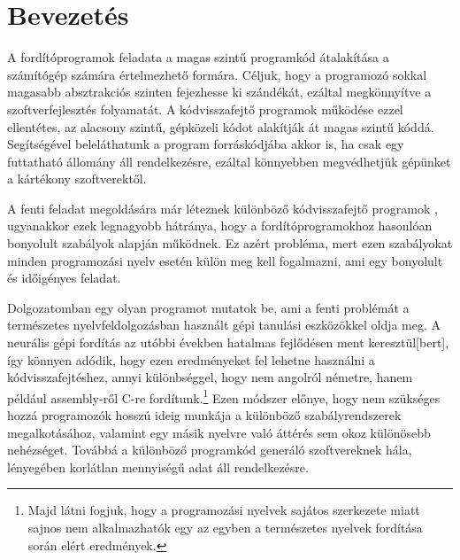 \chapter{Bevezetés}
\label{ch:intro}

A fordítóprogramok feladata a magas szintű programkód átalakítása a számítógép számára értelmezhető formára. Céljuk, hogy a programozó sokkal magasabb absztrakciós szinten fejezhesse ki szándékát, ezáltal megkönnyítve a szoftverfejlesztés folyamatát. A kódvisszafejtő programok működése ezzel ellentétes, az alacsony szintű, gépközeli kódot alakítják át magas szintű kóddá. Segítségével beleláthatunk a program forráskódjába akkor is, ha csak egy futtatható állomány áll rendelkezésre, ezáltal könnyebben megvédhetjük gépünket a kártékony szoftverektől.

A fenti feladat megoldására már léteznek különböző kódvisszafejtő programok \cite{ghidra, binaryninja}, ugyanakkor ezek legnagyobb hátránya, hogy a fordítóprogramokhoz hasonlóan bonyolult szabályok alapján működnek. Ez azért probléma, mert ezen szabályokat minden programozási nyelv esetén külön meg kell fogalmazni, ami egy bonyolult és időigényes feladat.

Dolgozatomban egy olyan programot mutatok be, ami a fenti problémát a természetes nyelvfeldolgozásban használt gépi tanulási eszközökkel oldja meg. A neurális gépi fordítás az utóbbi években hatalmas fejlődésen ment keresztül[bert], így könnyen adódik, hogy ezen eredményeket fel lehetne használni a kódvisszafejtéshez, annyi különbséggel, hogy nem angolról németre, hanem például assembly-ről C-re fordítunk.\footnote{Majd látni fogjuk, hogy a programozási nyelvek sajátos szerkezete miatt sajnos nem alkalmazhatók egy az egyben a természetes nyelvek fordítása során elért eredmények.} Ezen módszer előnye, hogy nem szükséges hozzá programozók hosszú ideig munkája a különböző szabályrendszerek megalkotásához, valamint egy másik nyelvre való áttérés sem okoz különösebb nehézséget. Továbbá a különböző programkód generáló szoftvereknek\cite{??} hála, lényegében korlátlan mennyiségű adat áll rendelkezésre.
